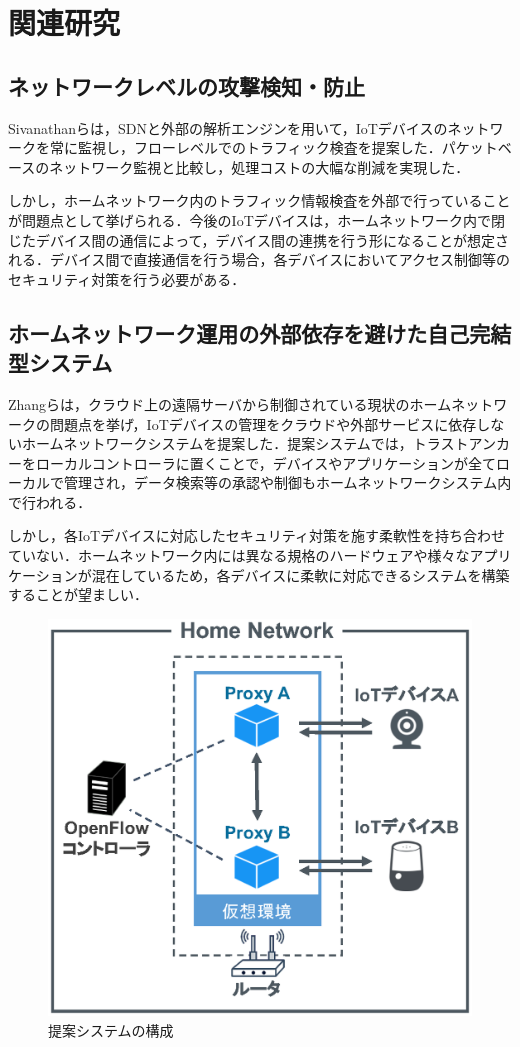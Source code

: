 \documentclass[Japanese]{dicomopapers}
\begin{document}
\section{関連研究}
\subsection{ネットワークレベルの攻撃検知・防止}
Sivanathanらは，SDNと外部の解析エンジンを用いて，IoTデバイスのネットワークを常に監視し，フローレベルでのトラフィック検査を提案した\cite{lowcost}．パケットベースのネットワーク監視と比較し，処理コストの大幅な削減を実現した．\par
しかし，ホームネットワーク内のトラフィック情報検査を外部で行っていることが問題点として挙げられる．今後のIoTデバイスは，ホームネットワーク内で閉じたデバイス間の通信によって，デバイス間の連携を行う形になることが想定される\cite{d2d}．デバイス間で直接通信を行う場合，各デバイスにおいてアクセス制御等のセキュリティ対策を行う必要がある．


\subsection{ホームネットワーク運用の外部依存を避けた自己完結型システム}
Zhangらは，クラウド上の遠隔サーバから制御されている現状のホームネットワークの問題点を挙げ，IoTデバイスの管理をクラウドや外部サービスに依存しないホームネットワークシステムを提案した\cite{sover}．提案システムでは，トラストアンカーをローカルコントローラに置くことで，デバイスやアプリケーションが全てローカルで管理され，データ検索等の承認や制御もホームネットワークシステム内で行われる．\par
しかし，各IoTデバイスに対応したセキュリティ対策を施す柔軟性を持ち合わせていない．ホームネットワーク内には異なる規格のハードウェアや様々なアプリケーションが混在しているため，各デバイスに柔軟に対応できるシステムを構築することが望ましい．

\begin{figure}[!tb]
	\centering
	\includegraphics[width=\linewidth]{img/system.eps}
	\caption{提案システムの構成}
	\label{fig:system}
\end{figure}
\end{document}
